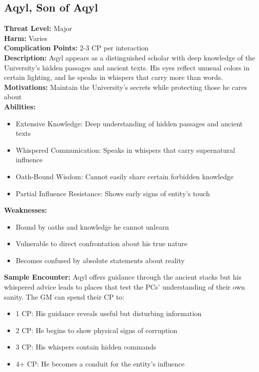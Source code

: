 \documentclass[11pt]{article}
\newenvironment{monsterentry}[1]{%
  \begin{mdframed}[backgroundcolor=shadecolor, linewidth=0pt, leftmargin=0pt, rightmargin=0pt]%
  \subsection*{#1}%
}{%
  \end{mdframed}%
}
\begin{document}
\begin{monsterentry}{Aqyl, Son of Aqyl}
\textbf{Threat Level:} Major \\
\textbf{Harm:} Varies \\
\textbf{Complication Points:} 2-3 CP per interaction \\
\textbf{Description:} Aqyl appears as a distinguished scholar with deep knowledge of the University's hidden passages and ancient texts. His eyes reflect unusual colors in certain lighting, and he speaks in whispers that carry more than words. \\
\textbf{Motivations:} Maintain the University's secrets while protecting those he cares about \\
\textbf{Abilities:}
\begin{itemize}
    \item Extensive Knowledge: Deep understanding of hidden passages and ancient texts
    \item Whispered Communication: Speaks in whispers that carry supernatural influence
    \item Oath-Bound Wisdom: Cannot easily share certain forbidden knowledge
    \item Partial Influence Resistance: Shows early signs of entity's touch
\end{itemize}
\textbf{Weaknesses:}
\begin{itemize}
    \item Bound by oaths and knowledge he cannot unlearn
    \item Vulnerable to direct confrontation about his true nature
    \item Becomes confused by absolute statements about reality
\end{itemize}
\textbf{Sample Encounter:} Aqyl offers guidance through the ancient stacks but his whispered advice leads to places that test the PCs' understanding of their own sanity. The GM can spend their CP to:
\begin{itemize}
    \item 1 CP: His guidance reveals useful but disturbing information
    \item 2 CP: He begins to show physical signs of corruption
    \item 3 CP: His whispers contain hidden commands
    \item 4+ CP: He becomes a conduit for the entity's influence
\end{itemize}
\end{monsterentry}
\end{document}
